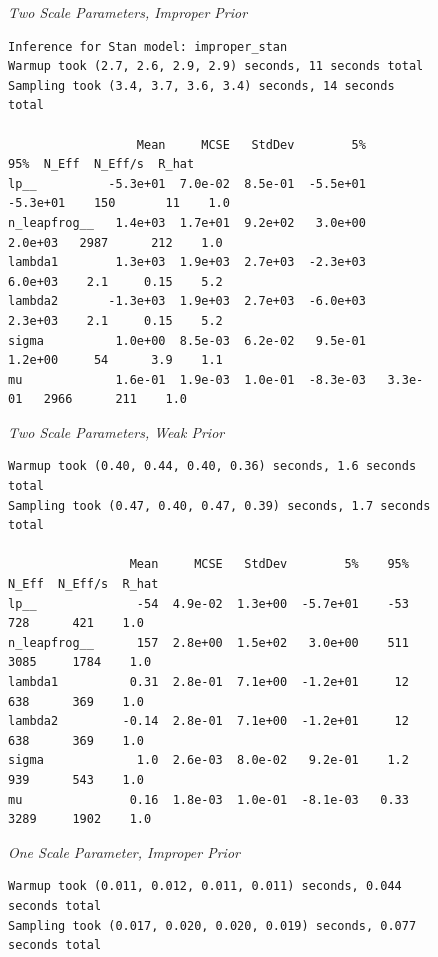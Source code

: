 \begin{figure}
%
\normalsize {\it Two Scale Parameters, Improper Prior}
%
\footnotesize
\begin{Verbatim}
Inference for Stan model: improper_stan
Warmup took (2.7, 2.6, 2.9, 2.9) seconds, 11 seconds total
Sampling took (3.4, 3.7, 3.6, 3.4) seconds, 14 seconds total

                  Mean     MCSE   StdDev        5%       95%  N_Eff  N_Eff/s  R_hat
lp__          -5.3e+01  7.0e-02  8.5e-01  -5.5e+01  -5.3e+01    150       11    1.0
n_leapfrog__   1.4e+03  1.7e+01  9.2e+02   3.0e+00   2.0e+03   2987      212    1.0
lambda1        1.3e+03  1.9e+03  2.7e+03  -2.3e+03   6.0e+03    2.1     0.15    5.2
lambda2       -1.3e+03  1.9e+03  2.7e+03  -6.0e+03   2.3e+03    2.1     0.15    5.2
sigma          1.0e+00  8.5e-03  6.2e-02   9.5e-01   1.2e+00     54      3.9    1.1
mu             1.6e-01  1.9e-03  1.0e-01  -8.3e-03   3.3e-01   2966      211    1.0
\end{Verbatim}
%
\vspace*{12pt}
%
\normalsize
{\it Two Scale Parameters, Weak Prior}
%
\footnotesize
\begin{Verbatim}
Warmup took (0.40, 0.44, 0.40, 0.36) seconds, 1.6 seconds total
Sampling took (0.47, 0.40, 0.47, 0.39) seconds, 1.7 seconds total

                 Mean     MCSE   StdDev        5%    95%  N_Eff  N_Eff/s  R_hat
lp__              -54  4.9e-02  1.3e+00  -5.7e+01    -53    728      421    1.0
n_leapfrog__      157  2.8e+00  1.5e+02   3.0e+00    511   3085     1784    1.0
lambda1          0.31  2.8e-01  7.1e+00  -1.2e+01     12    638      369    1.0
lambda2         -0.14  2.8e-01  7.1e+00  -1.2e+01     12    638      369    1.0
sigma             1.0  2.6e-03  8.0e-02   9.2e-01    1.2    939      543    1.0
mu               0.16  1.8e-03  1.0e-01  -8.1e-03   0.33   3289     1902    1.0
\end{Verbatim}
%
\vspace*{12pt}
%
\normalsize {\it One Scale Parameter, Improper Prior}
%
\footnotesize
\begin{Verbatim}
Warmup took (0.011, 0.012, 0.011, 0.011) seconds, 0.044 seconds total
Sampling took (0.017, 0.020, 0.020, 0.019) seconds, 0.077 seconds total


\end{Verbatim}
\end{figure}
